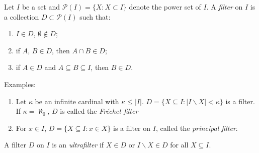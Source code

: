 \documentclass[
	fontsize=10pt, %
]{kaohandt}
\begin{document}
\begin{definition}[Ultrafilters]
    Let $I$ be a set and $\mathcal{P}(I) = \{ X : X \subset I\}$
    denote the power set of $I$.
    A \emph{filter} on $I$ is a collection $D \subset \mathcal{P}(I)$ such that:
    \begin{enumerate}[label = {\roman*)}]
        \item $I \in D$, $\emptyset \not\in D$;
        \item if $A$, $B \in D$, then $A \cap B \in D$;
        \item if $A\in D$ and $A \subseteq B \subseteq I$, then $B \in D$.
    \end{enumerate}
    Examples:
    \begin{enumerate}
        \item Let $\kappa$ be an infinite cardinal with $\kappa \le |I|$. 
        $D = \{ X \subseteq I : |I \backslash X| < \kappa\}$ is a filter.
        If $\kappa = \aleph_0$, $D$ is called the \emph{Fr\'echet filter}
        \item For $x \in I$, $D = \{X\subseteq I: x\in X\}$ is a filter on $I$, called the \emph{principal filter}.
    \end{enumerate}

    A filter $D$ on $I$ is an \emph{ultrafilter} if $X \in D$ or $I\backslash X \in D$ for all $X \subseteq I$.
\end{definition}
\end{document}
